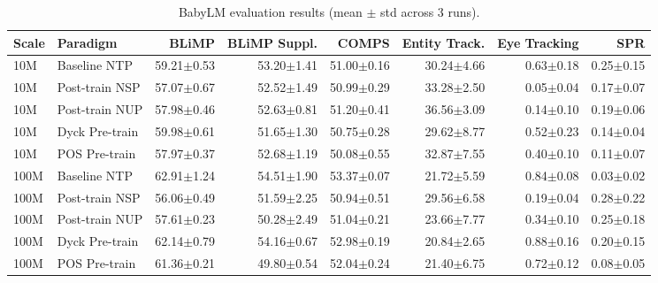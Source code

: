 \begin{table}[ht]
\centering
\caption{BabyLM evaluation results (mean $\pm$ std across 3 runs).}
\label{tab:babylm}
\begin{tabular}{llrrrrrr}
\toprule
Scale & Paradigm & BLiMP & BLiMP Suppl. & COMPS & Entity Track. & Eye Tracking & SPR \\
\midrule
10M & Baseline NTP & 59.21$\pm$0.53 & 53.20$\pm$1.41 & 51.00$\pm$0.16 & 30.24$\pm$4.66 & 0.63$\pm$0.18 & 0.25$\pm$0.15 \\
10M & Post-train NSP & 57.07$\pm$0.67 & 52.52$\pm$1.49 & 50.99$\pm$0.29 & 33.28$\pm$2.50 & 0.05$\pm$0.04 & 0.17$\pm$0.07 \\
10M & Post-train NUP & 57.98$\pm$0.46 & 52.63$\pm$0.81 & 51.20$\pm$0.41 & 36.56$\pm$3.09 & 0.14$\pm$0.10 & 0.19$\pm$0.06 \\
10M & Dyck Pre-train & 59.98$\pm$0.61 & 51.65$\pm$1.30 & 50.75$\pm$0.28 & 29.62$\pm$8.77 & 0.52$\pm$0.23 & 0.14$\pm$0.04 \\
10M & POS Pre-train & 57.97$\pm$0.37 & 52.68$\pm$1.19 & 50.08$\pm$0.55 & 32.87$\pm$7.55 & 0.40$\pm$0.10 & 0.11$\pm$0.07 \\
100M & Baseline NTP & 62.91$\pm$1.24 & 54.51$\pm$1.90 & 53.37$\pm$0.07 & 21.72$\pm$5.59 & 0.84$\pm$0.08 & 0.03$\pm$0.02 \\
100M & Post-train NSP & 56.06$\pm$0.49 & 51.59$\pm$2.25 & 50.94$\pm$0.51 & 29.56$\pm$6.58 & 0.19$\pm$0.04 & 0.28$\pm$0.22 \\
100M & Post-train NUP & 57.61$\pm$0.23 & 50.28$\pm$2.49 & 51.04$\pm$0.21 & 23.66$\pm$7.77 & 0.34$\pm$0.10 & 0.25$\pm$0.18 \\
100M & Dyck Pre-train & 62.14$\pm$0.79 & 54.16$\pm$0.67 & 52.98$\pm$0.19 & 20.84$\pm$2.65 & 0.88$\pm$0.16 & 0.20$\pm$0.15 \\
100M & POS Pre-train & 61.36$\pm$0.21 & 49.80$\pm$0.54 & 52.04$\pm$0.24 & 21.40$\pm$6.75 & 0.72$\pm$0.12 & 0.08$\pm$0.05 \\
\bottomrule
\end{tabular}
\end{table}